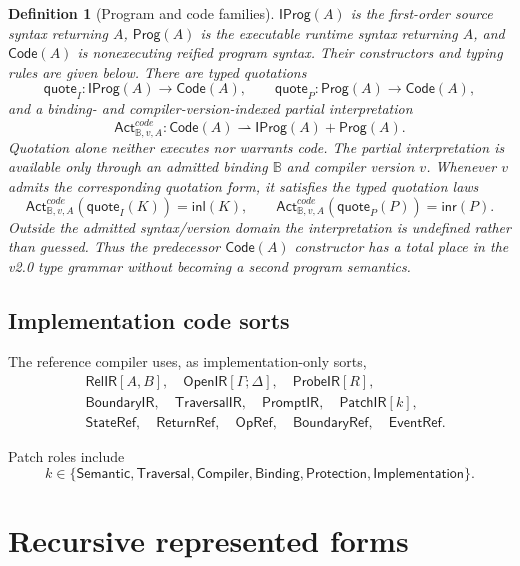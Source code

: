\documentclass[11pt,oneside]{article}
\newtheorem{definition}{Definition}[section]
\newcommand{\B}{\mathbb B}
\newcommand{\Prog}{\mathsf{Prog}}
\newcommand{\OpenIR}{\mathsf{OpenIR}}
\newcommand{\RelIR}{\mathsf{RelIR}}
\newcommand{\ProbeIR}{\mathsf{ProbeIR}}
\newcommand{\BoundaryIR}{\mathsf{BoundaryIR}}
\newcommand{\TraversalIR}{\mathsf{TraversalIR}}
\newcommand{\PromptIR}{\mathsf{PromptIR}}
\newcommand{\PatchIR}{\mathsf{PatchIR}}
\newcommand{\StateRef}{\mathsf{StateRef}}
\newcommand{\ReturnRef}{\mathsf{ReturnRef}}
\newcommand{\OpRef}{\mathsf{OpRef}}
\newcommand{\BoundaryRef}{\mathsf{BoundaryRef}}
\newcommand{\EventRef}{\mathsf{EventRef}}
\begin{document}
\begin{definition}[Program and code families]\label{def:program-code-families}
\(\mathsf{IProg}(A)\) is the first-order source syntax returning \(A\),
\(\Prog(A)\) is the executable runtime syntax returning \(A\), and
\(\mathsf{Code}(A)\) is nonexecuting reified program syntax.  Their constructors and typing rules
are given below.  There are typed quotations
\[
\mathsf{quote}_I:\mathsf{IProg}(A)\to\mathsf{Code}(A),
\qquad
\mathsf{quote}_P:\Prog(A)\to\mathsf{Code}(A),
\]
and a binding- and compiler-version-indexed partial interpretation
\[
\mathsf{Act}^{code}_{\B,v,A}:
\mathsf{Code}(A)
\rightharpoonup
\mathsf{IProg}(A)+\Prog(A).
\]
Quotation alone neither executes nor warrants code.  The partial interpretation is available only
through an admitted binding \(\B\) and compiler version \(v\).  Whenever \(v\) admits the
corresponding quotation form, it satisfies the typed quotation laws
\[
\mathsf{Act}^{code}_{\B,v,A}(\mathsf{quote}_I(K))=\mathsf{inl}(K),
\qquad
\mathsf{Act}^{code}_{\B,v,A}(\mathsf{quote}_P(P))=\mathsf{inr}(P).
\]
Outside the admitted syntax/version domain the interpretation is undefined rather than guessed.
Thus the predecessor \(\mathsf{Code}(A)\)
constructor has a total place in the v2.0 type grammar without becoming a second program semantics.
\end{definition}

\subsection{Implementation code sorts}

The reference compiler uses, as implementation-only sorts,
\[
\begin{aligned}
&\RelIR[A,B],\quad
\OpenIR[\Gamma;\Delta],\quad
\ProbeIR[R],\\
&\BoundaryIR,\quad
\TraversalIR,\quad
\PromptIR,\quad
\PatchIR[k],\\
&\StateRef,\quad
\ReturnRef,\quad
\OpRef,\quad
\BoundaryRef,\quad
\EventRef.
\end{aligned}
\]

Patch roles include
\[
k\in
\{
\mathsf{Semantic},
\mathsf{Traversal},
\mathsf{Compiler},
\mathsf{Binding},
\mathsf{Protection},
\mathsf{Implementation}
\}.
\]


\section{Recursive represented forms}
\end{document}
